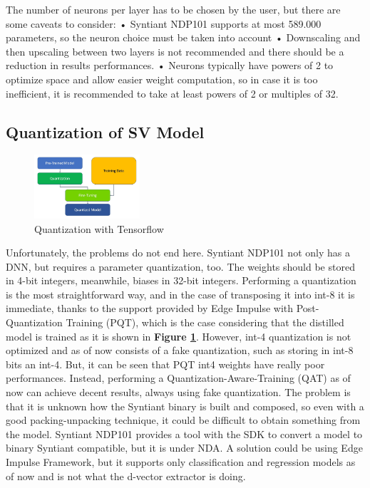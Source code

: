 The number of neurons per layer has to be chosen by the user, but there are some caveats to consider:\newline
• Syntiant NDP101 supports at most 589.000 parameters, so the neuron choice must be taken into account\newline
• Downscaling and then upscaling between two layers is not recommended and there should be a reduction in results performances.\newline
• Neurons typically have powers of 2 to optimize space and allow easier weight computation, so in case it is too inefficient, it is recommended to take at least powers of 2 or multiples of 32.\newline
\subsection{Quantization of SV Model}
\label{sec:quantization}
\begin{figure}
  \begin{center}
    \includegraphics[width=0.35\textwidth]{images/3.04 Quantization Flow.jpg}
  \end{center}
  \caption{Quantization with Tensorflow \cite{pqt_tensorflow}}
  \label{fig:quantization with tensorflow}
\end{figure}
Unfortunately, the problems do not end here. Syntiant NDP101 not only has a DNN, but requires a parameter quantization, too. The weights should be stored in 4-bit\cite{description_ndp101} integers, meanwhile, biases in 32-bit integers. Performing a quantization is the most straightforward way, and in the case of transposing it into int-8 it is immediate, thanks to the support provided by Edge Impulse with Post-Quantization Training (PQT)\cite{pqt_tensorflow}, which is the case considering that the distilled model is trained as it is shown in \textbf{Figure \ref{fig:quantization with tensorflow}}. However, int-4 quantization is not optimized and as of now consists of a fake quantization, such as storing in int-8 bits an int-4.\cite{wu2023understandingint4quantizationtransformer} But, it can be seen that PQT int4 weights have really poor performances. Instead, performing a Quantization-Aware-Training (QAT)\cite{qat_tensorflow} as of now can achieve decent results, always using fake quantization. The problem is that it is unknown how the Syntiant binary is built and composed, so even with a good packing-unpacking technique, it could be difficult to obtain something from the model. Syntiant NDP101 provides a tool with the SDK to convert a model to binary Syntiant compatible, but it is under NDA. A solution could be using Edge Impulse Framework\cite{edgeimpulse_firmware_syntiant}, but it supports only classification and regression models as of now and is not what the d-vector extractor is doing.\newline
